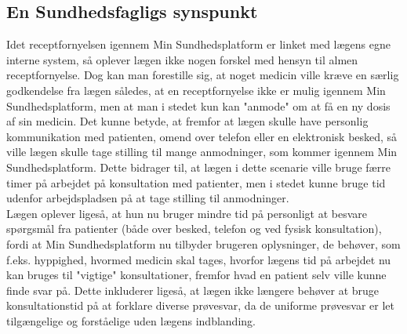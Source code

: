 \subsection{En Sundhedsfagligs synspunkt}
Idet receptfornyelsen igennem Min Sundhedsplatform er linket med lægens egne interne system, så oplever lægen ikke nogen forskel med hensyn til almen receptfornyelse. Dog kan man forestille sig, at noget medicin ville kræve en særlig godkendelse fra lægen således, at en receptfornyelse ikke er mulig igennem Min Sundhedsplatform, men at man i stedet kun kan "anmode" om at få en ny dosis af sin medicin. Det kunne betyde, at fremfor at lægen skulle have personlig kommunikation med patienten, omend over telefon eller en elektronisk besked, så ville lægen skulle tage stilling til mange anmodninger, som kommer igennem Min Sundhedsplatform. Dette bidrager til, at lægen i dette scenarie ville bruge færre timer på arbejdet på konsultation med patienter, men i stedet kunne bruge tid udenfor arbejdspladsen på at tage stilling til anmodninger. \\
Lægen oplever ligeså, at hun nu bruger mindre tid på personligt at besvare spørgsmål fra patienter (både over besked, telefon og ved fysisk konsultation), fordi at Min Sundhedsplatform nu tilbyder brugeren oplysninger, de behøver, som f.eks. hyppighed, hvormed medicin skal tages, hvorfor lægens tid på arbejdet nu kan bruges til "vigtige" konsultationer, fremfor hvad en patient selv ville kunne finde svar på. Dette inkluderer ligeså, at lægen ikke længere behøver at bruge konsultationstid på at forklare diverse prøvesvar, da de uniforme prøvesvar er let tilgængelige og forståelige uden lægens indblanding.\\
 
